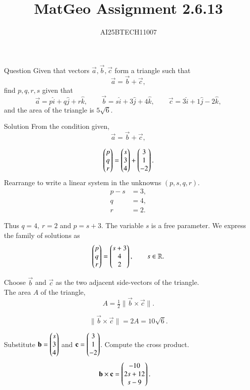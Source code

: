 \documentclass{beamer}
\title 
{MatGeo Assignment 2.6.13}
\author
{AI25BTECH11007}
\begin{document}
\frame{\titlepage}
\begin{frame}{Question}
Given that vectors $\vec{a},\vec{b},\vec{c}$ form a triangle such that
\[
\vec{a}=\vec{b}+\vec{c},
\]
find $p,q,r,s$ given that
\[
\vec{a}=p\hat{i}+q\hat{j}+r\hat{k},\qquad
\vec{b}=s\hat{i}+3\hat{j}+4\hat{k},\qquad
\vec{c}=3\hat{i}+1\hat{j}-2\hat{k},
\]
and the area of the triangle is $5\sqrt{6}$.\\


\end{frame}
\begin{frame}{Solution}
From the condition given, 
\[
\vec{a}=\vec{b}+\vec{c},
\]

\begin{equation}
\begin{pmatrix}p\\q\\r\end{pmatrix} = \begin{pmatrix}s\\3\\4\end{pmatrix} + \begin{pmatrix}3\\1\\-2\end{pmatrix}.
\end{equation}
Rearrange to write a linear system in the unknowns $(p,s,q,r)$.
\begin{align}
p - s &= 3,\\
q       &= 4,\\
r       &= 2. 
\end{align}

Thus $q=4,\ r=2$ and $p=s+3$. The variable $s$ is a free parameter. We express the family of solutions as
\begin{equation}\label{eq:param_solution}
\begin{pmatrix}p\\q\\r\end{pmatrix} = \begin{pmatrix}s+3\\4\\2\end{pmatrix},\qquad s\in\mathbb{R}.
\end{equation}
\end{frame}
\begin{frame}
Choose $\vec{b}$ and $\vec{c}$ as the two adjacent side-vectors of the triangle.\\ The area $A$ of the triangle,
\begin{equation}\label{eq:area_formula}
A=\tfrac{1}{2}\|\vec{b}\times\vec{c}\|.
\end{equation}

\begin{equation}
\|\vec{b}\times\vec{c}\| = 2A = 10\sqrt{6}.
\end{equation}

Substitute $\mathbf{b}=\begin{pmatrix}s\\3\\4\end{pmatrix}$ and $\mathbf{c}=\begin{pmatrix}3\\1\\-2\end{pmatrix}$. Compute the cross product.
\begin{align}
\mathbf{b}\times\mathbf{c}
&= \begin{pmatrix}-10\\2s+12\\s-9\end{pmatrix}.
\end{align}
\end{frame}
\end{document}
